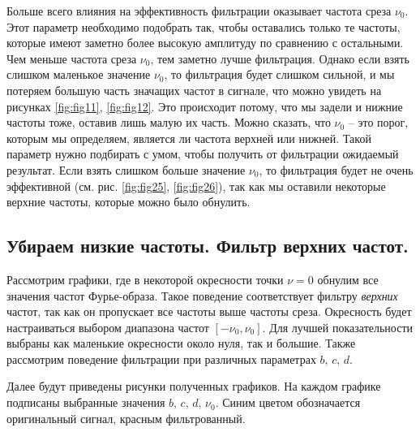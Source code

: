 \documentclass[a4paper, 12pt]{article}
\begin{document}
    Больше всего влияния на эффективность фильтрации оказывает частота среза $\nu_0$. Этот параметр необходимо подобрать
    так, чтобы оставались только те частоты, которые имеют заметно более высокую амплитуду по сравнению с остальными.
    Чем меньше частота среза $\nu_0$, тем заметно лучше фильтрация. Однако если взять слишком маленькое значение $\nu_0$,
    то фильтрация будет слишком сильной, и мы потеряем большую часть значащих частот в сигнале, что можно увидеть на рисунках
    \ref{fig:fig11}, \ref{fig:fig12}. Это происходит потому, что мы задели и нижние частоты тоже, оставив лишь малую их часть. Можно сказать, что
    $\nu_0$ -- это порог, которым мы определяем, является ли частота верхней или нижней. Такой параметр нужно подбирать с умом, чтобы
    получить от фильтрации ожидаемый результат. Если взять слишком больше значение $\nu_0$, то фильтрация будет не очень эффективной
    (см. рис. \ref{fig:fig25}, \ref{fig:fig26}), так как мы оставили некоторые верхние частоты, которые можно было обнулить.


    \subsection{Убираем низкие частоты. Фильтр верхних частот.}
    Рассмотрим графики, где в некоторой окресности точки $\nu=0$ обнулим все значения частот Фурье-образа.
    Такое поведение соответствует фильтру \textit{верхних} частот, так как он пропускает все частоты выше частоты среза.
    Окресность будет настраиваться выбором диапазона частот $[-\nu_0,\nu_0]$. Для лучшей показательности выбраны как маленькие
    окресности около нуля, так и большие. Также рассмотрим поведение фильтрации при различных параметрах $b,\,c,\,d$.


    Далее будут приведены рисунки полученных графиков. На каждом графике подписаны выбранные значения $b,\,c,\,d,\,\nu_0$. 
    Синим цветом обозначается оригинальный сигнал, красным фильтрованный.
\end{document}
